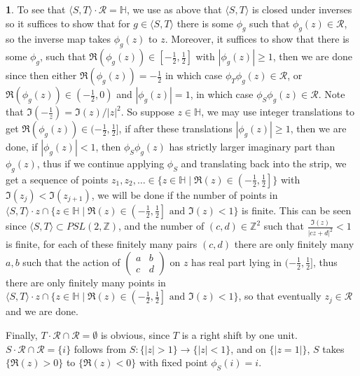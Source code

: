 \documentclass[10.5pt]{article}
\theoremstyle{definition}
\newtheorem{pb}{}
\newcommand{\set}[1]{\{#1\}}
\newcommand{\gen}[1]{\langle#1\rangle}
\newcommand{\abs}[1]{\left\vert#1\right\vert}
\newcommand{\tand}{\text{ and }}
\begin{document}
\begin{pb}
        To see that \(\gen{S,T} \cdot\mathcal{R} = \mathbb{H}\), we use as above that \(\gen{S,T}\) is closed under inverses so it suffices to show that for \(g \in \gen{S,T}\) there is some \(\phi_g\) such that \(\phi_g(z) \in \mathcal{R}\), so the inverse map takes \(\phi_g(z)\) to \(z\). Moreover, it suffices to show that there is some \(\phi_g\), such that \(\Re(\phi_g(z)) \in \left[-\frac12,\frac12\right]\) with \(\abs{\phi_g(z)} \geq 1\), then we are done since then either \(\Re(\phi_g(z)) = -\frac12\) in which case \(\phi_{T}\phi_g(z) \in \mathcal{R}\), or \(\Re(\phi_g(z)) \in \left(-\frac12,0\right)\) and \(\abs{\phi_g(z)} = 1\), in which case \(\phi_S\phi_g(z) \in \mathcal{R}\). Note that \(\Im(-\frac{1}{z}) = \Im(z)/\abs{z}^2\). So suppose \(z \in \mathbb{H}\), we may use integer translations to get \(\Re(\phi_g(z)) \in (-\frac12,\frac12]\), if after these translations \(\abs{\phi_g(z)} \geq 1\), then we are done, if \(\abs{\phi_g(z)} < 1\), then \(\phi_S\phi_g(z)\) has strictly larger imaginary part than \(\phi_g(z)\), thus if we continue applying \(\phi_S\) and translating back into the strip, we get a sequence of points \(z_1,z_2,\hdots \in \set{z \in \mathbb{H} \mid \Re(z) \in \left(-\frac12,\frac12\right]}\) with \(\Im(z_j) < \Im(z_{j+1})\), we will be done if the number of points in \(\gen{S,T}\cdot z \cap \set{z \in \mathbb{H} \mid \Re(z) \in \left(-\frac12,\frac12\right] \tand \Im(z) < 1}\) is finite. This can be seen since \(\gen{S,T} \subset PSL(2,\mathbb{Z})\), and the number of \((c,d) \in \mathbb{Z}^2\) such that \(\frac{\Im(z)}{\abs{cz+d}^2} < 1\) is finite, for each of these finitely many pairs \((c,d)\) there are only finitely many \(a,b\) such that the action of \(\begin{pmatrix} a&b\\c&d \end{pmatrix}\) on \(z\) has real part lying in \((-\frac12,\frac12]\), thus there are only finitely many points in \(\gen{S,T}\cdot z \cap \set{z \in \mathbb{H} \mid \Re(z) \in \left(-\frac12,\frac12\right] \tand \Im(z) < 1}\), so that eventually \(z_j \in \mathcal{R}\) and we are done.

        Finally, \(T\cdot \mathcal{R} \cap \mathcal{R} = \emptyset\) is obvious, since \(T\) is a right shift by one unit. \(S\cdot \mathcal{R} \cap \mathcal{R} = \set{i}\) follows from \(S: \set{\abs{z} > 1} \to \set{\abs{z} < 1}\), and on \(\set{\abs{z = 1}}\), \(S\) takes \(\set{\Re(z) > 0}\) to \(\set{\Re(z) < 0}\) with fixed point \(\phi_S(i) = i\).


\end{pb}
\end{document}
